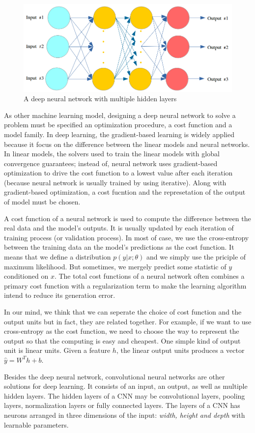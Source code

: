 \begin{figure}[h]
	\centering
	\includegraphics[scale=0.5]{images/deep_neural_network}
	\caption{A deep neural network with multiple hidden layers}
	\label{figndeepnetworks}
\end{figure}

As other machine learning model, designing a deep neural network to solve a problem must be specified an optimization procedure, a cost function and a model family. In deep learning, the gradient-based learning is widely applied because it focus on the difference between the linear models and neural networks. In linear models, the solvers used to train the linear models with global convergence guarantees; instead of, neural network uses gradient-based optimization to drive the cost function to a lowest value after each iteration (because neural network is usually trained by using iterative). Along with gradient-based optimization, a cost fucntion and the represetation of the output of model must be chosen.

A cost function of a neural network is used to compute the difference between the real data and the model's outputs. It is usually updated by each iteration of training process (or validation process). In most of case, we use the cross-entropy between the training data an the model's predictions as the cost function. It means that we define a distribution $p(y | x; \theta)$ and we simply use the priciple of maximum likelihood. But sometimes, we mergely predict some statistic of $y$ conditioned on $x$. The total cost functions of a neural network often combines a primary cost function with a regularization term to make the learning algorithm intend to reduce its generation error.

In our mind, we think that we can seperate the choice of cost function and the output units but in fact, they are related together. For example, if we want to use cross-entropy as the cost function, we need to choose the way to represent the output so that the computing is easy and cheapest. One simple kind of output unit is linear units. Given a feature $h$, the linear output units produces a vector $\hat{y} = W^{T}h + b$.





Besides the deep neural network, convolutional neural networks are other solutions for deep learning. It consists of an input, an output, as well as multiple hidden layers. The hidden layers of a CNN may be convolutional layers, pooling layers, normalization layers or fully connected layers. The layers of a CNN has neurons arranged in three dimensions of the input: \textit{width, height and depth} with learnable parameters.
